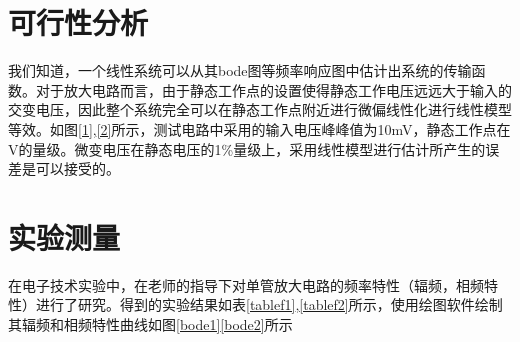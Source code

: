 \documentclass[UTF8,a4paper]{ctexart}
\begin{document}
\section{可行性分析}
我们知道，一个线性系统可以从其bode图等频率响应图中估计出系统的传输函数。对于放大电路而言，由于静态工作点的设置使得静态工作电压远远大于输入的交变电压，因此整个系统完全可以在静态工作点附近进行微偏线性化进行线性模型等效。如图\ref{1},\ref{2}所示，测试电路中采用的输入电压峰峰值为10mV，静态工作点在V的量级。微变电压在静态电压的1\%量级上，采用线性模型进行估计所产生的误差是可以接受的。

\section{实验测量}
在电子技术实验中，在老师的指导下对单管放大电路的频率特性（辐频，相频特性）进行了研究。得到的实验结果如表\ref{tablef1},\ref{tablef2}所示，使用绘图软件绘制其辐频和相频特性曲线如图\ref{bode1}\ref{bode2}所示
\end{document}
